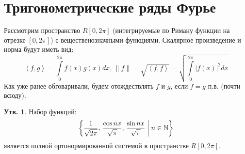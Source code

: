 \documentclass[12pt]{article}
\newcommand{\MN}{\mathbb{N}}
\theoremstyle{definition}
\newtheorem{prop}{Утв.}
\newcommand{\ddint}[2]{\displaystyle\int\limits_{#1}^{#2}}
\newcommand{\inner}[2]{\left\langle #1, #2 \right\rangle }
\begin{document}
\section*{Тригонометрические ряды Фурье}
Рассмотрим пространство $R[0,2\pi]$ (интегрируемые по Риману функции на отрезке $[0,2\pi]$) с вещественозначными функциями. Скалярное произведение и норма будут иметь вид:
$$
	\inner{f}{g} = \ddint{0}{2\pi}f(x)g(x)dx, \, \|f\| = \sqrt{\inner{f}{f}} = \sqrt{\ddint{0}{2\pi}|f(x)|^2dx}
$$
Как уже ранее обговаривали, будем отождествлять $f$ и $g$, если $f = g$ п.в. (почти всюду).
\begin{prop}
	Набор функций: 
	$$
		\left\{\dfrac{1}{\sqrt{2\pi}}, \, \dfrac{\cos{nx}}{\sqrt{\pi}}, \, \dfrac{\sin{nx}}{\sqrt{\pi}}  \biggm\vert  n \in \MN  \right\}
	$$ 
	является полной ортонормированной системой в пространстве $R[0,2\pi]$.
\end{prop}
\end{document}
